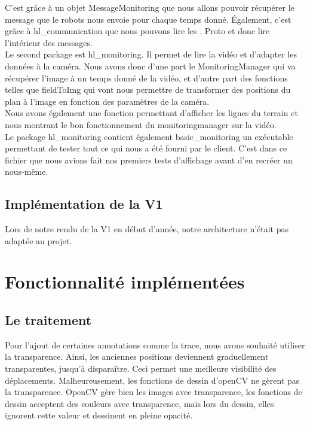 \documentclass[a4paper,12pt]{report}
\begin{document}
C'est grâce à un objet MessageMonitoring que nous allons pouvoir récupérer le message que le robots nous envoie pour chaque temps donné. 
Également, c'est grâce à hl\_communication que nous pouvons lire les . Proto et donc lire l'intérieur des messages.
\\

Le second package est hl\_monitoring. Il permet de lire la vidéo et d'adapter les données à la caméra.
Nous avons donc d'une part le MonitoringManager qui va récupérer l'image à un temps donné de la vidéo, et d'autre part des fonctions telles que fieldToImg qui vont nous permettre de transformer des positions du plan à l'image en fonction des paramètres de la caméra.
\\

Nous avons également une fonction permettant d'afficher les lignes du terrain et nous montrant le bon fonctionnement du monitoringmanager sur la vidéo.
\\

Le package hl\_monitoring contient également basic\_monitoring un exécutable permettant de tester tout ce qui nous a été fourni par le client. C'est dans ce fichier que nous avions fait nos premiers tests d'affichage avant d'en recréer un nous-même.

\section{Implémentation de la V1}

Lors de notre rendu de la V1 en début d'année, notre architecture n'était pas adaptée au projet.



   
\chapter{Fonctionnalité implémentées}

\section{Le traitement}

Pour l'ajout de certaines annotations comme la trace, nous avons souhaité utiliser la transparence. Ainsi, les anciennes positions deviennent graduellement transparentes, jusqu'à disparaître. Ceci permet une meilleure visibilité des déplacements. Malheureusement, les fonctions de dessin d'openCV ne gèrent pas la transparence. OpenCV gère bien les images avec transparence, les fonctions de dessin acceptent des couleurs avec transparence, mais lors du dessin, elles ignorent cette valeur et dessinent en pleine opacité. 
\\
\end{document}
